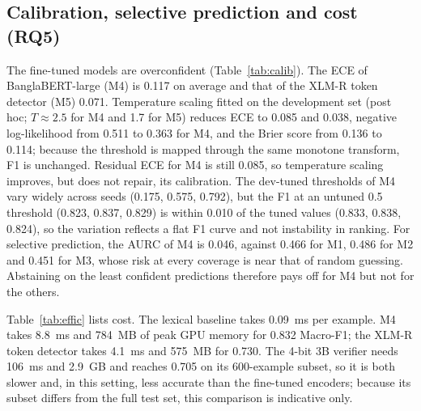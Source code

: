 \documentclass[manuscript,screen,review]{acmart}
\newcommand{\fit}[1]{\resizebox{\ifdim\width>\linewidth\linewidth\else\width\fi}{!}{#1}}
\begin{document}
\subsection{Calibration, selective prediction and cost (RQ5)}\label{sec:calib}
The fine-tuned models are overconfident (Table~\ref{tab:calib}). The ECE of BanglaBERT-large (M4) is 0.117 on average and that of the XLM-R token detector (M5) 0.071. Temperature scaling \cite{guo2017calibration} fitted on the development set (post hoc; $T\approx 2.5$ for M4 and 1.7 for M5) reduces ECE to 0.085 and 0.038, negative log-likelihood from 0.511 to 0.363 for M4, and the Brier score from 0.136 to 0.114; because the threshold is mapped through the same monotone transform, F1 is unchanged. Residual ECE for M4 is still 0.085, so temperature scaling improves, but does not repair, its calibration. The dev-tuned thresholds of M4 vary widely across seeds (0.175, 0.575, 0.792), but the F1 at an untuned 0.5 threshold (0.823, 0.837, 0.829) is within 0.010 of the tuned values (0.833, 0.838, 0.824), so the variation reflects a flat F1 curve and not instability in ranking. For selective prediction, the AURC of M4 is 0.046, against 0.466 for M1, 0.486 for M2 and 0.451 for M3, whose risk at every coverage is near that of random guessing. Abstaining on the least confident predictions therefore pays off for M4 but not for the others.

\begin{table}[t]
\caption{Temperature scaling (post hoc; mean over three seeds, fitted on the development set, evaluated on test): calibration improves but M4 remains overconfident. Arrows go from before to after scaling. F1 ($\tau^*$) is unchanged by scaling; F1 (0.5) uses an untuned threshold.}
\label{tab:calib}
\small
\fit{}
\end{table}

Table~\ref{tab:effic} lists cost. The lexical baseline takes 0.09~ms per example. M4 takes 8.8~ms and 784~MB of peak GPU memory for 0.832 Macro-F1; the XLM-R token detector takes 4.1~ms and 575~MB for 0.730. The 4-bit 3B verifier needs 106~ms and 2.9~GB and reaches 0.705 on its 600-example subset, so it is both slower and, in this setting, less accurate than the fine-tuned encoders; because its subset differs from the full test set, this comparison is indicative only.

\begin{table}[t]
\caption{Accuracy and cost on BangHallu test: the fine-tuned encoders are both more accurate and faster than the 4-bit LLM verifier. M6 is evaluated on a class-stratified subset of 600 examples; all others on the full 1,228.}
\label{tab:effic}
\small
\fit{}
\end{table}
\end{document}
